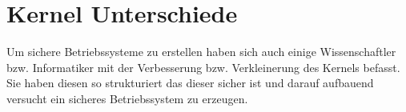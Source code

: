\documentclass[9pt,technote]{IEEEtran}
\begin{document}
   
  \section{Kernel Unterschiede} \label{sec:kernel}
    Um sichere Betriebssysteme zu erstellen haben sich auch einige Wissenschaftler bzw. Informatiker mit der Verbesserung bzw. Verkleinerung
    des Kernels befasst. Sie haben diesen so strukturiert das dieser sicher ist und darauf aufbauend versucht ein sicheres Betriebssystem zu erzeugen.
  


\end{document}
